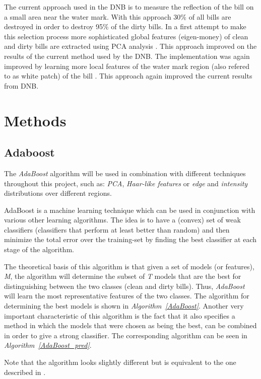 \documentclass[11pt,twocolumn]{article}
\begin{document}
		The current approach used in the DNB is to measure the reflection of the bill on a small area near the water mark. With this approach 30\% of all bills are destroyed in order to destroy 95\% of the dirty bills. In a first attempt to make this selection process more		sophisticated global features (eigen-money) of clean and dirty bills are extracted using PCA analysis \cite{MoNuSt}. This approach improved on the results of the current method used by the DNB. The implementation was again improved by learning more local features of the water mark region (also refered to as white patch) of the bill \cite{Geusebroek}. This approach again improved the current results from DNB.	
	\section{Methods}\label{sec:Methods}
		\subsection{Adaboost}\label{sec:Adaboost}
			The \emph{AdaBoost} algorithm will be used in combination with different techniques throughout this project, such as: \emph{PCA}, \emph{Haar-like features} or \emph{edge} and \emph{intensity} distributions over different regions.

			AdaBoost is a machine learning technique which can be used in conjunction with various other learning algorithms. The idea is to have a (convex) set of weak classifiers (classifiers that perform at least better than random) and then minimize the total error over the training-set by finding the best classifier at each stage of the algorithm.

			The theoretical basis of this algorithm is that given a set of models (or features), \emph{M}, the algorithm will determine the subset of \emph{T} models that	 are the best for distinguishing between the two classes (clean and dirty bills). Thus, \emph{AdaBoost} will learn the most representative features of the two classes. The algorithm for determining the best models is shown in \emph{Algorithm~\ref{AdaBoost}}.	Another very important characteristic of this algorithm is the fact that it also specifies a method in which the models that were chosen as being the best, can be combined in order to give a strong classifier. The corresponding algorithm can be seen in \emph{Algorithm~\ref{AdaBoost_pred}}. 
			
			Note that the algorithm looks slightly different but is equivalent to the one described in \cite{Haar}.
			
\end{document}
